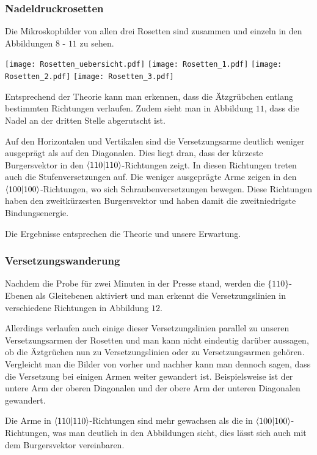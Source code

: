 \documentclass[12pt,a4paper]{scrartcl}
\numberwithin{equation}{section} %
\renewcommand{\[}{} %
\renewcommand{\]}{\noindent} %
\begin{document}
\hypertarget{nadeldruckrosetten-1}{%
\subsubsection{Nadeldruckrosetten}\label{nadeldruckrosetten-1}}

Die Mikroskopbilder von allen drei Rosetten sind zusammen und einzeln in
den Abbildungen \(8\) - \(11\) zu sehen.

\texttt{[image: Rosetten\_uebersicht.pdf]}
\texttt{[image: Rosetten\_1.pdf]} \texttt{[image: Rosetten\_2.pdf]}
\texttt{[image: Rosetten\_3.pdf]}

Entsprechend der Theorie kann man erkennen, dass die Ätzgrübchen entlang
bestimmten Richtungen verlaufen. Zudem sieht man in Abbildung \(11\),
dass die Nadel an der dritten Stelle abgerutscht ist.

Auf den Horizontalen und Vertikalen sind die Versetzungsarme deutlich
weniger ausgeprägt als auf den Diagonalen. Dies liegt dran, dass der
kürzeste Burgersvektor in den \(\braket{110}\)-Richtungen zeigt. In
diesen Richtungen treten auch die Stufenversetzungen auf. Die weniger
ausgeprägte Arme zeigen in den \(\braket{100}\)-Richtungen, wo sich
Schraubenversetzungen bewegen. Diese Richtungen haben den zweitkürzesten
Burgersvektor und haben damit die zweitniedrigste Bindungsenergie.

Die Ergebnisse entsprechen die Theorie und unsere Erwartung.

\hypertarget{versetzungswanderung}{%
\subsubsection{Versetzungswanderung}\label{versetzungswanderung}}

Nachdem die Probe für zwei Minuten in der Presse stand, werden die
\(\lbrace110\rbrace\)-Ebenen als Gleitebenen aktiviert und man erkennt
die Versetzungslinien in verschiedene Richtungen in Abbildung \(12\).

Allerdings verlaufen auch einige dieser Versetzungslinien parallel zu
unseren Versetzungsarmen der Rosetten und man kann nicht eindeutig
darüber aussagen, ob die Äztgrüchen nun zu Versetzungslinien oder zu
Versetzungsarmen gehören. Vergleicht man die Bilder von vorher und
nachher kann man dennoch sagen, dass die Versetzung bei einigen Armen
weiter gewandert ist. Beispielsweise ist der untere Arm der oberen
Diagonalen und der obere Arm der unteren Diagonalen gewandert.

Die Arme in \(\braket{110}\)-Richtungen sind mehr gewachsen als die in
\(\braket{100}\)-Richtungen, was man deutlich in den Abbildungen sieht,
dies lässt sich auch mit dem Burgersvektor vereinbaren.
\end{document}
